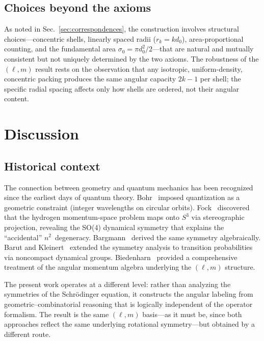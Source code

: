 \documentclass[aps,prl,reprint,amsmath,amssymb]{revtex4-2}
\begin{document}
\subsection{Choices beyond the axioms}

As noted in Sec.~\ref{sec:correspondences}, the construction involves
structural choices---concentric shells, linearly spaced radii
($r_k = k d_0$), area-proportional counting, and the fundamental area
$\sigma_0 = \pi d_0^2 / 2$---that are natural and mutually consistent
but not uniquely determined by the two axioms.  The robustness of the
$(\ell, m)$ result rests on the observation that any isotropic,
uniform-density, concentric packing produces the same angular capacity
$2k - 1$ per shell; the specific radial spacing affects only how
shells are ordered, not their angular content.


\section{Discussion}
\label{sec:discussion}

\subsection{Historical context}

The connection between geometry and quantum mechanics has been
recognized since the earliest days of quantum theory.
Bohr~\cite{bohr1913} imposed quantization as a geometric constraint
(integer wavelengths on circular orbits).
Fock~\cite{fock1935} discovered that the hydrogen momentum-space
problem maps onto $S^3$ via stereographic projection, revealing the
SO(4) dynamical symmetry that explains the ``accidental''
$n^2$~degeneracy.  Bargmann~\cite{bargmann1936} derived the same
symmetry algebraically.  Barut and Kleinert~\cite{barut1967}
extended the symmetry analysis to transition probabilities via
noncompact dynamical groups.  Biedenharn~\cite{biedenharn1981}
provided a comprehensive treatment of the angular momentum algebra
underlying the $(\ell, m)$ structure.

The present work operates at a different level: rather than analyzing
the symmetries of the Schr\"odinger equation, it constructs the
angular labeling from geometric--combinatorial reasoning that is
logically independent of the operator formalism.  The result is the
same $(\ell, m)$ basis---as it must be, since both approaches reflect
the same underlying rotational symmetry---but obtained by a different
route.
\end{document}
